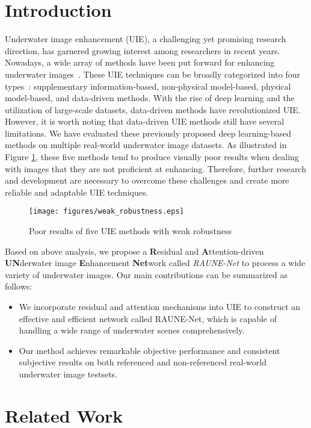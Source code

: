 \documentclass[runningheads]{llncs}
\begin{document}
\section{Introduction}
Underwater image enhancement (UIE), a challenging yet promising research direction, has garnered growing interest among researchers in recent years. Nowadays, a wide array of methods have been put forward for enhancing underwater images~\cite{liu2023uiqi}. These UIE techniques can be broadly categorized into four types~\cite{li2019underwater}: supplementary information-based, non-physical model-based, physical model-based, and data-driven methods. With the rise of deep learning and the utilization of large-scale datasets, data-driven methods have revolutionized UIE. However, it is worth noting that data-driven UIE methods still have several limitations. We have evaluated these previously proposed deep learning-based methods on multiple real-world underwater image datasets. As illustrated in Figure \hyperref[5-UIE-methods]{1}, these five methods tend to produce visually poor results when dealing with images that they are not proficient at enhancing. Therefore, further research and development are necessary to overcome these challenges and create more reliable and adaptable UIE techniques.

\begin{figure}
\centering
\texttt{[image: figures/weak\_robustness.eps]}
\caption{Poor results of five UIE methods with weak robustness}
\label{5-UIE-methods}
\end{figure}

Based on above analysis, we propose a \textbf{R}esidual and \textbf{A}ttention-driven \textbf{UN}derwater image \textbf{E}nhancement \textbf{Net}work called \textit{RAUNE-Net} to process a wide variety of underwater images. Our main contributions can be summarized as follows:

\begin{itemize}[label=$\cdot$]
    \item We incorporate residual and attention mechanisms into UIE to construct an effective and efficient network called RAUNE-Net, which is capable of handling a wide range of underwater scenes comprehensively.
    \item Our method achieves remarkable objective performance and consistent subjective results on both referenced and non-referenced real-world underwater image testsets.
\end{itemize}

\section{Related Work}\label{sec.2}
\end{document}
